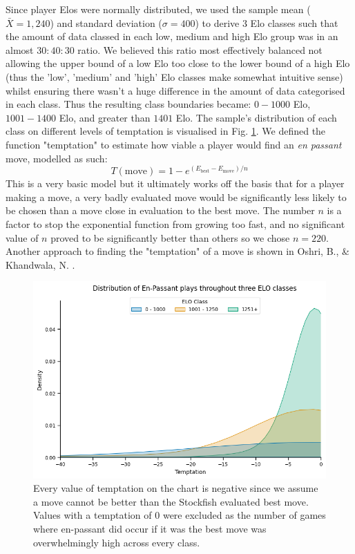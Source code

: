 \documentclass[10pt,a4paper]{article}
\begin{document}
\begin{multicols}{2}
Since player Elos were normally distributed, we used the sample mean ($\bar{X} = 1,240$) and standard deviation ($\sigma = 400$) to derive $3$ Elo classes such that the amount of data classed in each low, medium and high Elo group was in an almost $30:40:30$ ratio. We believed this ratio most effectively balanced not allowing the upper bound of a low Elo too close to the lower bound of a high Elo (thus the 'low', 'medium' and 'high' Elo classes make somewhat intuitive sense) whilst ensuring there wasn't a huge difference in the amount of data categorised in each class. Thus the resulting class boundaries became: $0 - 1000$ Elo, $1001 - 1400$ Elo, and greater than $1401$ Elo. The sample's distribution of each class on different levels of temptation is visualised in Fig. \ref{fds-project-template:fig:ep_distplot}. We defined the function "temptation" to estimate how viable a player would find an \textit{en passant} move, modelled as such:
$$T(\text{move})= 1 -e^{(E_{\text{best}} - E_{\text{move}})/{n}}$$
This is a very basic model but it ultimately works off the basis that for a player making a move, a very badly evaluated move would be significantly less likely to be chosen than a move close in evaluation to the best move. The number $n$ is a factor to stop the exponential function from growing too fast, and no significant value of $n$ proved to be significantly better than others so we chose $n=220$. Another approach to finding the "temptation" of a move is shown in Oshri, B., \& Khandwala, N. \cite{mcilroy2022learning}.\newline

\begin{figure}[t]
  \centering
  \includegraphics[width=\textwidth]{report/images/ep_distplot.png}
  \caption{Every value of temptation on the chart is negative since we assume a move cannot be better than the Stockfish evaluated best move. Values with a temptation of $0$ were excluded as the number of games where en-passant did occur if it was the best move was overwhelmingly high across every class.}
  \label{fds-project-template:fig:ep_distplot}
\end{figure}


\end{multicols}
\end{document}
